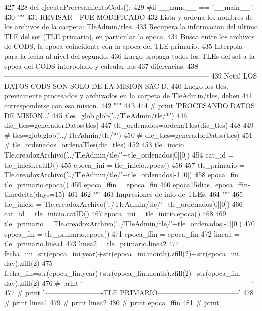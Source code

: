\begin{DoxyCode}
427 
428 def ejecutaProcesamientoCods():
429 #if __name__ == '__main__':
430     """
431     REVISAR - FUE MODIFICADO
432     Lista y ordena los nombres de los archivos de la carpeta: TleAdmin/tles.
433     Recupera la informacion del ultimo TLE del set (TLE primario), en
       particular la epoca.
434     Busca entre los archivos de CODS, la epoca coincidente con la epoca del TLE
       primario.
435     Interpola para la fecha al nivel del segundo. 
436     Luego propaga todos los TLEs del set a la epoca del CODS interpolado y
       calcular las 
437     diferencias. 
438    
       ---------------------------------------------------------------------------------------
439     Nota! LOS DATOS CODS SON SOLO DE LA MISION SAC-D.
440     Luego los tles, previamente procesados y archivados en la carpeta de
       TleAdmin/tles, deben
441     corresponderse con esa mision.
442     """
443 
444 #    print 'PROCESANDO DATOS DE MISION...'
445     tles=glob.glob('../TleAdmin/tle/*')
446     dic_tles=generadorDatos(tles)
447     tle_ordenados=ordenaTles(dic_tles)
448     
449 #     tles=glob.glob('../TleAdmin/tle/*')
450 #     dic_tles=generadorDatos(tles)
451 #     tle_ordenados=ordenaTles(dic_tles)
452     
453     tle_inicio = Tle.creadoxArchivo('../TleAdmin/tle/'+tle_ordenados[0][0])
454     cat_id = tle_inicio.catID()
455     epoca_ini = tle_inicio.epoca()
456     
457     tle_primario = Tle.creadoxArchivo('../TleAdmin/tle/'+tle_ordenados[-1][0])
458     epoca_fin  = tle_primario.epoca()
459     epoca_ffin = epoca_fin
460     epoca15dias=epoca_ffin-timedelta(days=15)
461     
462     """
463     Impresiones de info de TLEs.
464     """
465     tle_inicio = Tle.creadoxArchivo('../TleAdmin/tle/'+tle_ordenados[0][0])
466     cat_id = tle_inicio.catID()
467     epoca_ini = tle_inicio.epoca()
468     
469     tle_primario = Tle.creadoxArchivo('../TleAdmin/tle/'+tle_ordenados[-1][0])
470     epoca_fin  = tle_primario.epoca()
471     epoca_ffin = epoca_fin
472     linea1 = tle_primario.linea1
473     linea2 = tle_primario.linea2
474     fecha_ini=str(epoca_ini.year)+str(epoca_ini.month).zfill(2)+str(epoca_ini.
      day).zfill(2)
475     fecha_fin=str(epoca_fin.year)+str(epoca_fin.month).zfill(2)+str(epoca_fin.
      day).zfill(2)
476 #     print
       '------------------------------------------------------------------------'
477 #     print '-------------------------TLE
       PRIMARIO-----------------------------------'
478 #     print linea1
479 #     print linea2
480 #     print epoca_ffin
481 #     print

\end{DoxyCode}

